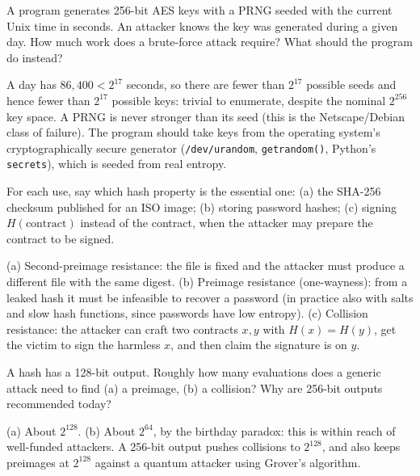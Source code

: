 \begin{exercise}
A program generates 256-bit AES keys with a PRNG seeded with the current Unix time in seconds. An attacker knows the key was generated during a given day. How much work does a brute-force attack require? What should the program do instead?
\end{exercise}
\begin{solution}
A day has $86{,}400 < 2^{17}$ seconds, so there are fewer than $2^{17}$ possible seeds and hence fewer than $2^{17}$ possible keys: trivial to enumerate, despite the nominal $2^{256}$ key space. A PRNG is never stronger than its seed (this is the Netscape/Debian class of failure). The program should take keys from the operating system's cryptographically secure generator (\texttt{/dev/urandom}, \texttt{getrandom()}, Python's \texttt{secrets}), which is seeded from real entropy.
\end{solution}

\begin{exercise}
For each use, say which hash property is the essential one: (a) the SHA-256 checksum published for an ISO image; (b) storing password hashes; (c) signing $H(\text{contract})$ instead of the contract, when the attacker may prepare the contract to be signed.
\end{exercise}
\begin{solution}
(a) Second-preimage resistance: the file is fixed and the attacker must produce a different file with the same digest. (b) Preimage resistance (one-wayness): from a leaked hash it must be infeasible to recover a password (in practice also with salts and slow hash functions, since passwords have low entropy). (c) Collision resistance: the attacker can craft two contracts $x, y$ with $H(x) = H(y)$, get the victim to sign the harmless $x$, and then claim the signature is on $y$.
\end{solution}

\begin{exercise}
A hash has a 128-bit output. Roughly how many evaluations does a generic attack need to find (a) a preimage, (b) a collision? Why are 256-bit outputs recommended today?
\end{exercise}
\begin{solution}
(a) About $2^{128}$. (b) About $2^{64}$, by the birthday paradox: this is within reach of well-funded attackers. A 256-bit output pushes collisions to $2^{128}$, and also keeps preimages at $2^{128}$ against a quantum attacker using Grover's algorithm.
\end{solution}

